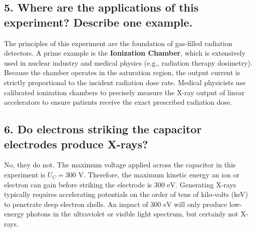 \documentclass[a4paper,11pt]{article}
\begin{document}
\subsection*{5. Where are the applications of this experiment? Describe one example.}
The principles of this experiment are the foundation of gas-filled radiation detectors. A prime example is the \textbf{Ionization Chamber}, which is extensively used in nuclear industry and medical physics (e.g., radiation therapy dosimetry). Because the chamber operates in the saturation region, the output current is strictly proportional to the incident radiation dose rate. Medical physicists use calibrated ionization chambers to precisely measure the X-ray output of linear accelerators to ensure patients receive the exact prescribed radiation dose.

\subsection*{6. Do electrons striking the capacitor electrodes produce X-rays?}
No, they do not. The maximum voltage applied across the capacitor in this experiment is $U_C = 300\text{ V}$. Therefore, the maximum kinetic energy an ion or electron can gain before striking the electrode is $300\text{ eV}$. Generating X-rays typically requires accelerating potentials on the order of tens of kilo-volts (keV) to penetrate deep electron shells. An impact of $300\text{ eV}$ will only produce low-energy photons in the ultraviolet or visible light spectrum, but certainly not X-rays.
\end{document}
